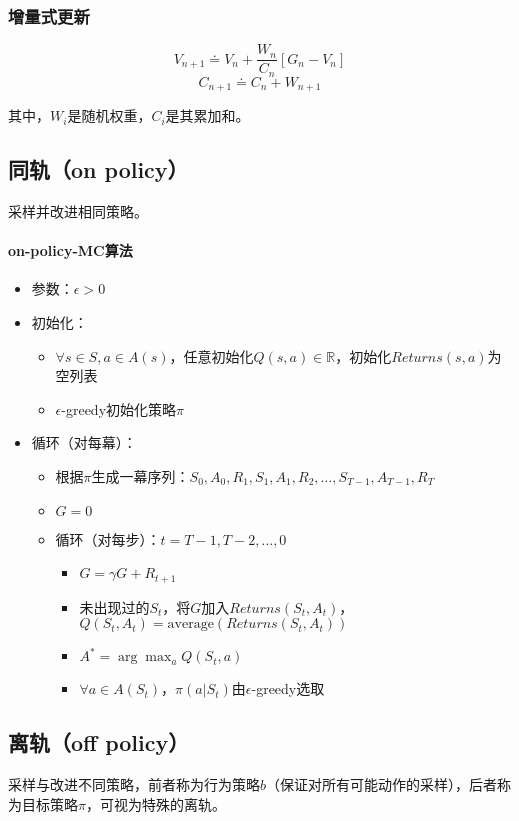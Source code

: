 \documentclass[
12pt, %
a4paper, 
oneside, %
headinclude,footinclude, %
]{scrartcl}
\begin{document}
\subsubsection{增量式更新}
$$ 
V_{n + 1} \doteq V_n + \frac{W_n}{C_n}[G_n - V_n] 
$$
$$
C_{n + 1} \doteq C_n + W_{n + 1}
$$

其中，$ W_i $是随机权重，$ C_i $是其累加和。
\subsection{同轨（on policy）}
采样并改进相同策略。
\paragraph{on-policy-MC算法}
\begin{itemize}
\item 参数：$ \epsilon > 0 $
\item 初始化：
\begin{itemize}
\item $ \forall s \in S, a \in A(s) $，任意初始化$ Q(s,a) \in \mathbb{R} $，初始化$ Returns(s,a) $为空列表
\item $ \epsilon $-greedy初始化策略$ \pi $
\end{itemize}
\item 循环（对每幕）：
\begin{itemize}
\item 根据$ \pi $生成一幕序列：$ S_0,A_0,R_1,S_1,A_1,R_2,\dots,S_{T - 1},A_{T - 1},R_T $
\item $ G = 0 $
\item 循环（对每步）：$ t = T - 1, T - 2, \dots, 0 $
\begin{itemize}
\item $ G = \gamma G + R_{t + 1} $ 
\item 未出现过的$ S_t $，将$ G $加入$ Returns(S_t,A_t) $，$ Q(S_t,A_t) = \text{average}(Returns(S_t,A_t)) $
\item $ A^* = \arg \max_a Q(S_t,a) $
\item $ \forall a \in A(S_t) $，$ \pi(a|S_t) $由$ \epsilon $-greedy选取
\end{itemize}
\end{itemize}
\end{itemize}
\subsection{离轨（off policy）}
采样与改进不同策略，前者称为行为策略$ b $（保证对所有可能动作的采样），后者称为目标策略$ \pi $，可视为特殊的离轨。
\end{document}
